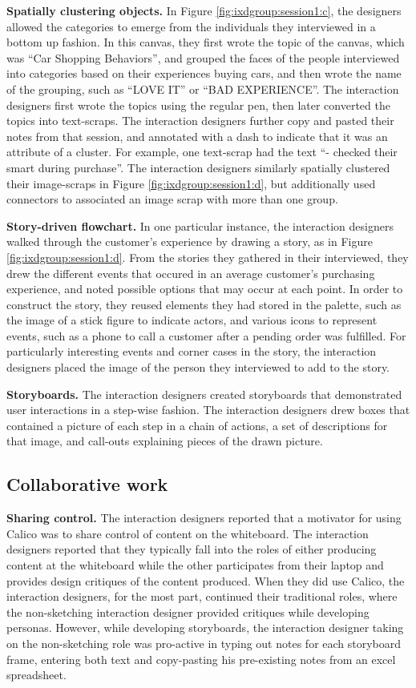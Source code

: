 \textbf{Spatially clustering objects.} In Figure \ref{fig:ixdgroup:session1:c}, the designers allowed the categories to emerge from the individuals they interviewed in a bottom up fashion. In this canvas, they first wrote the topic of the canvas, which was ``Car Shopping Behaviors'', and grouped the faces of the people interviewed into categories based on their experiences buying cars, and then wrote the name of the grouping, such as ``LOVE IT'' or ``BAD EXPERIENCE''. The interaction designers first wrote the topics using the regular pen, then later converted the topics into text-scraps. The interaction designers further copy and pasted their notes from that session, and annotated with a dash to indicate that it was an attribute of a cluster. For example, one text-scrap had the text ``- checked their smart during purchase''. The interaction designers similarly spatially clustered their image-scraps in Figure \ref{fig:ixdgroup:session1:d}, but additionally used connectors to associated an image scrap with more than one group.

\textbf{Story-driven flowchart. } In one particular instance, the interaction designers walked through the customer's experience by drawing a story, as in Figure \ref{fig:ixdgroup:session1:d}. From the stories they gathered in their interviewed, they drew the different events that occured in an average customer's purchasing experience, and noted possible options that may occur at each point. In order to construct the story, they reused elements they had stored in the palette, such as the image of a stick figure to indicate actors, and various icons to represent events, such as a phone to call a customer after a pending order was fulfilled. For particularly interesting events and corner cases in the story, the interaction designers placed the image of the person they interviewed to add to the story. 

\textbf{Storyboards.} The interaction designers created storyboards that demonstrated user interactions in a step-wise fashion. The interaction designers drew boxes that contained a picture of each step in a chain of actions, a set of descriptions for that image, and call-outs explaining pieces of the drawn picture.

\subsection{Collaborative work}

\textbf{Sharing control.} The interaction designers reported that a motivator for using Calico was to share control of content on the whiteboard. The interaction designers reported that they typically fall into the roles of either producing content at the whiteboard while the other participates from their laptop and provides design critiques of the content produced. When they did use Calico, the interaction designers, for the most part, continued their traditional roles, where the non-sketching interaction designer provided critiques while developing personas. However, while developing storyboards, the interaction designer taking on the non-sketching role was pro-active in typing out notes for each storyboard frame, entering both text and copy-pasting his pre-existing notes from an excel spreadsheet.

